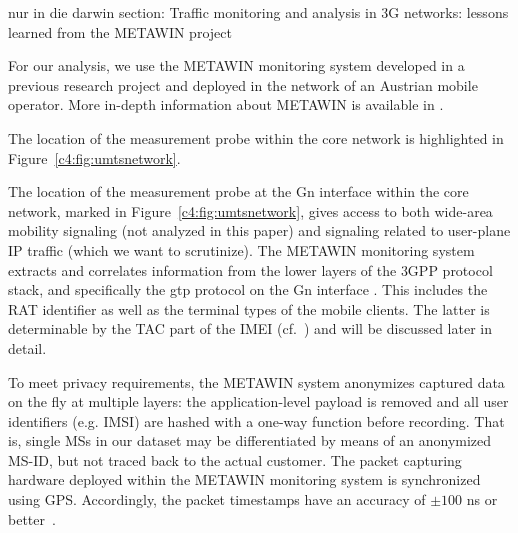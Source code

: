 	 nur in die darwin section: Traffic monitoring and analysis in 3G networks: lessons learned from the METAWIN project \cite{ricciato2006traffic}


For our analysis, we use the \gls{METAWIN} monitoring system developed in a previous research project and deployed in the network of an Austrian mobile operator.  More in-depth information about \gls{METAWIN} is available in \cite{ricciato_2011}.

The location of the measurement probe within the core network is highlighted in Figure~\ref{c4:fig:umtsnetwork}. 

 The location of the measurement probe at the Gn interface within the core network, marked in Figure~\ref{c4:fig:umtsnetwork}, gives access to both wide-area mobility signaling (not analyzed in this paper) and signaling related to user-plane IP traffic (which we want to scrutinize). The \gls{METAWIN} monitoring system extracts and correlates information from the lower layers of the \gls{3GPP} protocol stack, and specifically the \gls{gtp} protocol on the Gn interface \cite{3gpp.29.060}. This includes the \acrfull{RAT} identifier as well as the terminal types of the mobile clients. The latter is determinable by the \acrfull{TAC} part of the \acrfull{IMEI} (cf.~\cite{3gpp.23.003}) and will be discussed later in detail.

To meet privacy requirements, the \gls{METAWIN} system anonymizes captured data on the fly at multiple layers: the application-level payload is removed and all user identifiers (e.g. \gls{IMSI}) are hashed with a one-way function before recording. That is, single \glspl{MS} in our dataset may be differentiated by means of an anonymized \gls{MS-ID}, but not traced back to the actual customer. The packet capturing hardware deployed within the \gls{METAWIN} monitoring system is synchronized using \gls{GPS}. Accordingly, the packet timestamps have an accuracy of $\pm100$ ns or better~\cite[p.97-98]{donnelly_high_2002}.




